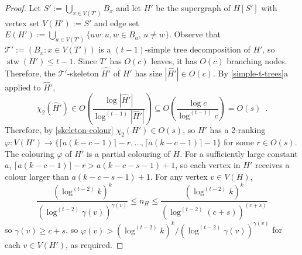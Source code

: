 \documentclass[kpfonts]{patmorin}
\DeclareMathOperator{\stw}{stw}
\newcommand{\trn}{\chi_2}
\theoremstyle{named}
\newcommand{\weirdref}[2]{\cref{#1}#2}
\begin{document}
\begin{proof}
    Let $S':=\bigcup_{x\in V(T')} B_x$ and let $H'$ be the supergraph of $H[S']$ with vertex set $V(H'):=S'$ and edge set $E(H'):=\bigcup_{a\in V(T')}\{uw:u,w\in B_a,\, u\neq w\}$. Observe that $\mathcal{T}':=(B_x:x\in V(T'))$ is a $(t-1)$-simple tree decomposition of $H'$, so $\stw(H')\le t-1$. Since $T'$ has $O(c)$ leaves, it has $O(c)$ branching nodes.
    Therefore, the $\mathcal{T}'$-skeleton $\hat{H'}$ of $H'$ has size $|\hat{H}'|\in O(c)$.
    By \weirdref{simple-t-trees}{a} applied to $\hat{H}'$,
    \[
       \trn(\hat{H}')\in
       O\left(\frac{\log|\hat{H}'|}{\log^{(t-1)}|\hat{H}'|}\right)
       \subseteq O\left(\frac{\log c}{\log^{(t-1)} c}\right) = O(s) \enspace .
    \]
    Therefore, by \cref{skeleton-colour} $\trn(H')\in O(s)$, so
    $H'$ has a 2-ranking $\varphi:V(H')\to \{\lceil a(k-c-1)\rceil-r,\ldots,\lceil a(k-c-1)\rceil-1\}$ for some $r\in O(s)$.
    The colouring $\varphi$ of $H'$ is a partial colouring of $H$.
    For a sufficiently large constant $a$, $\lceil a(k-c-1)\rceil-r >  a(k-c-s-1)+1$, so each vertex in $H'$ receives a colour larger than $a(k-c-s-1)+1$.  For any vertex $v\in V(H)$,
    \[ \frac{(\log^{(t-2)} k)^k}{(\log^{(t-2)}\gamma(v))^{\gamma(v)}}
         \le n_H
         \le \frac{(\log^{(t-2)} k)^k}{(\log^{(t-2)}(c+s))^{(c+s)}}
    \]
    so $\gamma(v)\ge c+s$, so $\varphi(v)> (\log^{(t-2)} k)^k/(\log^{(t-2)}\gamma(v))^{\gamma(v)}$ for each $v\in V(H')$, as required.


\end{proof}
\end{document}
